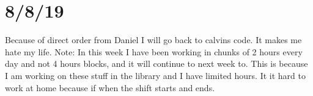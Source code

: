 \documentclass{article}
\begin{document}
\section{8/8/19}
Because of direct order from Daniel I will go back to calvins code. It makes me hate my life. Note: In this week I have been working in chunks of 2 hours every day and not 4 hours blocks, and it will continue to next week to. This is because I am working on these stuff in the library and I have limited hours. It it hard to work at home because if when the shift starts and ends.
\end{document}
